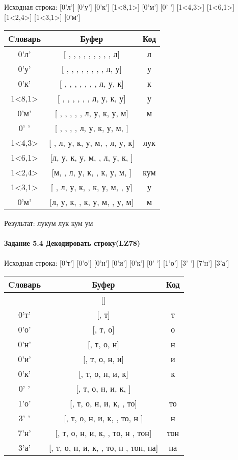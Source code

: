 \documentclass[a4paper, 12pt]{article}
\begin{document}
Исходная строка: [0'л'] [0'у'] [0'к'] [1<8,1>] [0'м'] [0' '] [1<4,3>] [1<6,1>] [1<2,4>] [1<3,1>] [0'м']\\
\begin{table}[h!]
\centering
\begin{tabular}{|c|c|c|}
\hline
 Cловарь & Буфер & Код  \\ \hline
0'л' & [ ,  ,  ,  ,  ,  ,  ,  ,  , л] & л
\\ \hline
0'у' & [ ,  ,  ,  ,  ,  ,  ,  , л, у] & у
\\ \hline
0'к' & [ ,  ,  ,  ,  ,  ,  , л, у, к] & к
\\ \hline
1<8,1> & [ ,  ,  ,  ,  ,  , л, у, к, у] & у
\\ \hline
0'м' & [ ,  ,  ,  ,  , л, у, к, у, м] & м
\\ \hline
0' ' & [ ,  ,  ,  , л, у, к, у, м,  ] &  
\\ \hline
1<4,3> & [ , л, у, к, у, м,  , л, у, к] & лук
\\ \hline
1<6,1> & [л, у, к, у, м,  , л, у, к,  ] &  
\\ \hline
1<2,4> & [м,  , л, у, к,  , к, у, м,  ] & кум 
\\ \hline
1<3,1> & [ , л, у, к,  , к, у, м,  , у] & у
\\ \hline
0'м' & [л, у, к,  , к, у, м,  , у, м] & м
\\ \hline
\end{tabular}
\end{table}

Результат: лукум лук кум ум
\pagebreak
\paragraph{Задание 5.4 Декодировать строку(LZ78)\\}

Исходная строка: [0'т'] [0'о'] [0'н'] [0'и'] [0'к'] [0' '] [1'о'] [3' '] [7'н'] [3'а']\\
\begin{table}[h!]
\centering
\begin{tabular}{|c|c|c|}
\hline
 Cловарь & Буфер & Код  \\ \hline
 & [] & 
\\ \hline
0'т' & [, т] & т
\\ \hline
0'о' & [, т, о] & о
\\ \hline
0'н' & [, т, о, н] & н
\\ \hline
0'и' & [, т, о, н, и] & и
\\ \hline
0'к' & [, т, о, н, и, к] & к
\\ \hline
0' ' & [, т, о, н, и, к,  ] &  
\\ \hline
1'о' & [, т, о, н, и, к,  , то] & то
\\ \hline
3' ' & [, т, о, н, и, к,  , то, н ] & н 
\\ \hline
7'н' & [, т, о, н, и, к,  , то, н , тон] & тон
\\ \hline
3'а' & [, т, о, н, и, к,  , то, н , тон, на] & на
\\ \hline
\end{tabular}
\end{table}
\end{document}
